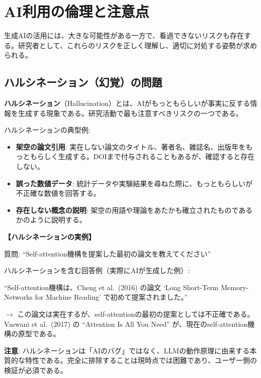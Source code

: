 \section{AI利用の倫理と注意点}
\label{sec:1.4}

生成AIの活用には、大きな可能性がある一方で、看過できないリスクも存在する。研究者として、これらのリスクを正しく理解し、適切に対処する姿勢が求められる。

\subsection{ハルシネーション（幻覚）の問題}

\textbf{ハルシネーション}（Hallucination）とは、AIがもっともらしいが事実に反する情報を生成する現象である。研究活動で最も注意すべきリスクの一つである\cite{ji2023hallucination}。

ハルシネーションの典型例:
\begin{itemize}
\item \textbf{架空の論文引用}: 実在しない論文のタイトル、著者名、雑誌名、出版年をもっともらしく生成する。DOIまで付与されることもあるが、確認すると存在しない。
\item \textbf{誤った数値データ}: 統計データや実験結果を尋ねた際に、もっともらしいが不正確な数値を回答する。
\item \textbf{存在しない概念の説明}: 架空の用語や理論をあたかも確立されたものであるかのように説明する。
\end{itemize}

\begin{promptbox}
\textbf{【ハルシネーションの実例】}

質問: ``Self-attention機構を提案した最初の論文を教えてください''

ハルシネーションを含む回答例（実際にAIが生成した例）:

``Self-attention機構は、Cheng et al.\ (2016) の論文 `Long Short-Term Memory-Networks for Machine Reading' で初めて提案されました。''

$\rightarrow$ この論文は実在するが、self-attentionの最初の提案としては不正確である。Vaswani et al.\ (2017)\cite{Vaswani2017} の ``Attention Is All You Need'' が、現在のself-attention機構の原型である。
\end{promptbox}

\begin{screen}
\textbf{注意}: ハルシネーションは「AIのバグ」ではなく、LLMの動作原理に由来する本質的な特性である。完全に排除することは現時点では困難であり、ユーザー側の検証が必須である。
\end{screen}

